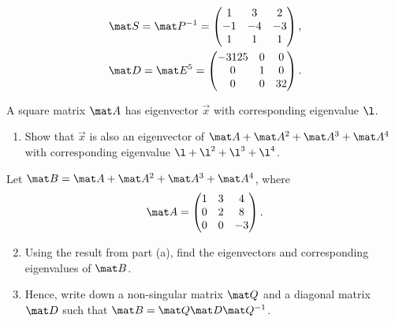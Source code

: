\begin{solution}
\begin{ppart}
\begin{psubpart}
\begin{gather*}
                \mat S = \mat P^{-1} = \begin{pmatrix}1 & 3 & 2 \\ -1 & -4 & -3 \\ 1 & 1 & 1\end{pmatrix},\\
                \mat D = \mat E^5 = \begin{pmatrix}-3125 & 0 & 0 \\ 0 & 1 & 0 \\ 0 & 0 & 32\end{pmatrix}.
            \end{gather*}
        \end{psubpart}
    \end{ppart}
\end{solution}

\clearpage
\begin{problem}
    A square matrix $\mat A$ has eigenvector $\vec x$ with corresponding eigenvalue $\l$.

    \begin{enumerate}
        \item Show that $\vec x$ is also an eigenvector of $\mat A + \mat A^2 + \mat A^3 + \mat A^4$ with corresponding eigenvalue $\l + \l^2 + \l^3 + \l^4$.
    \end{enumerate}

    Let $\mat B = \mat A + \mat A^2 + \mat A^3 + \mat A^4$, where \[\mat A = \begin{pmatrix}1 & 3 & 4 \\ 0 & 2 & 8 \\ 0 & 0 & -3\end{pmatrix}.\]

    \begin{enumerate}
        \setcounter{enumi}{1}
        \item Using the result from part (a), find the eigenvectors and corresponding eigenvalues of $\mat B$.
        \item Hence, write down a non-singular matrix $\mat Q$ and a diagonal matrix $\mat D$ such that $\mat B = \mat Q \mat D \mat Q^{-1}$.
    \end{enumerate}
\end{problem}
